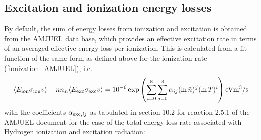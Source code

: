 \documentclass[amsmath,amssymb,a4]{revtex4}
\begin{document}
\subsection{Excitation and ionization energy losses}

By default, the sum of energy losses from ionization and excitation is obtained from the AMJUEL data base, which provides an effective excitation rate in terms of an averaged effective energy loss per ionization. This is calculated from a fit function of the same form as defined above for the ionization rate (\ref{ionization_AMJUEL}), i.e.
\begin{equation}
  \langle E_{\rm ion} \sigma_{\rm ion} v\rangle - n n_n \langle E_{\rm exc} \sigma_{\rm exc} v\rangle =  10^{-6} \exp\left( \sum_{i=0}^8\sum_{j=0}^8 \alpha_{ij} (\ln \bar n)^j (\ln T)^i \right)  {\rm eV} {\rm m}^3/{\rm s}
\end{equation}
with the coefficients $\alpha_{{\rm exc,} ij}$ as tabulated in section 10.2 for reaction 2.5.1 of the AMJUEL document for the case of the total energy loss rate associated with Hydrogen ionization and excitation radiation:
\end{document}
